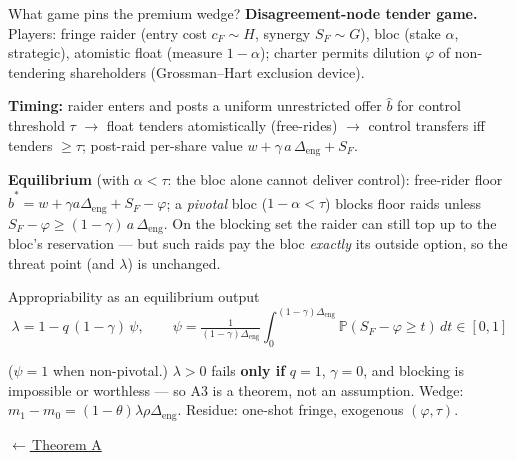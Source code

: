 \documentclass[aspectratio=169,10pt]{beamer}
\newcommand{\PP}{\mathbb{P}}
\newcommand{\1}{\mathbf{1}}
\newcommand{\returnlink}[2]{%
  \par\vspace{0.2em}\hfill{\scriptsize\hyperlink{#1}{\textcolor{brightblue}{$\leftarrow$\,#2}}}%
}
\begin{document}
\begin{frame}{What game pins the premium wedge?}
\hypertarget{backup:tender_game}{}
\small
\textbf{Disagreement-node tender game.} Players: fringe raider (entry cost
$c_F \sim H$, synergy $S_F \sim G$), bloc (stake $\alpha$, strategic),
atomistic float (measure $1-\alpha$); charter permits dilution $\varphi$ of
non-tendering shareholders (Grossman--Hart exclusion device).

\vspace{0.25em}
\textbf{Timing:} raider enters and posts a uniform unrestricted offer
$\hat b$ for control threshold $\tau$ $\to$ float tenders atomistically
(free-rides) $\to$ control transfers iff tenders $\ge \tau$; post-raid
per-share value $w + \gamma\, a\,\Delta_{\text{eng}} + S_F$.

\vspace{0.25em}
\textbf{Equilibrium} (with $\alpha < \tau$: the bloc alone cannot deliver
control): free-rider floor $\hat b^* = w + \gamma a \Delta_{\text{eng}} + S_F
- \varphi$; a \emph{pivotal} bloc ($1-\alpha < \tau$) blocks floor raids
unless $S_F - \varphi \ge (1-\gamma)\,a\,\Delta_{\text{eng}}$. On the
blocking set the raider can still top up to the bloc's reservation --- but
such raids pay the bloc \emph{exactly} its outside option, so the threat
point (and $\lambda$) is unchanged.

\vspace{0.25em}
\begin{block}{Appropriability as an equilibrium output}
\vspace{-0.4em}
\[
\lambda = 1 - q\,(1-\gamma)\,\psi, \qquad
\psi = \tfrac{1}{(1-\gamma)\Delta_{\text{eng}}}
\textstyle\int_0^{(1-\gamma)\Delta_{\text{eng}}}
\PP(S_F - \varphi \ge t)\,dt \in [0,1]
\]
\vspace{-0.9em}
\end{block}

{\footnotesize ($\psi = 1$ when non-pivotal.) $\lambda > 0$ fails \textbf{only if}
$q=1$, $\gamma=0$, and blocking is impossible or worthless --- so A3 is a
theorem, not an assumption. Wedge: $m_1 - m_0 = (1-\theta)\lambda\rho
\Delta_{\text{eng}}$. Residue: one-shot fringe, exogenous $(\varphi,\tau)$.}

\returnlink{main:thmA}{Theorem A}
\end{frame}
\end{document}
